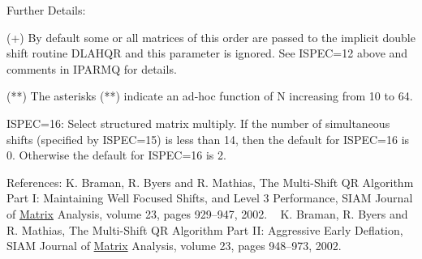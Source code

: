 \begin{DoxyParagraph}{Further Details\+: }
\begin{DoxyVerb}
                  (+)  By default some or all matrices of this order
                       are passed to the implicit double shift routine
                       DLAHQR and this parameter is ignored.  See
                       ISPEC=12 above and comments in IPARMQ for
                       details.

                 (**)  The asterisks (**) indicate an ad-hoc
                       function of N increasing from 10 to 64.

            ISPEC=16: Select structured matrix multiply.
                      If the number of simultaneous shifts (specified
                      by ISPEC=15) is less than 14, then the default
                      for ISPEC=16 is 0.  Otherwise the default for
                      ISPEC=16 is 2.\end{DoxyVerb}
 
\end{DoxyParagraph}
\begin{DoxyParagraph}{References\+: }
K. Braman, R. Byers and R. Mathias, The Multi-\/\+Shift Q\+R Algorithm Part I\+: Maintaining Well Focused Shifts, and Level 3 Performance, S\+I\+A\+M Journal of \hyperlink{classMatrix}{Matrix} Analysis, volume 23, pages 929--947, 2002. ~\newline
 K. Braman, R. Byers and R. Mathias, The Multi-\/\+Shift Q\+R Algorithm Part I\+I\+: Aggressive Early Deflation, S\+I\+A\+M Journal of \hyperlink{classMatrix}{Matrix} Analysis, volume 23, pages 948--973, 2002. 
\end{DoxyParagraph}
